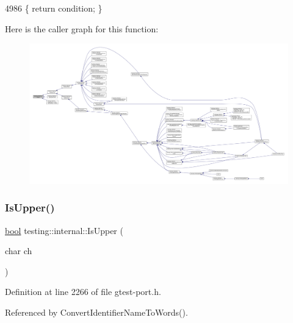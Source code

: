 \begin{DoxyCode}
4986 \{ \textcolor{keywordflow}{return} condition; \}
\end{DoxyCode}
Here is the caller graph for this function\+:
\nopagebreak
\begin{figure}[H]
\begin{center}
\leavevmode
\includegraphics[width=350pt]{namespacetesting_1_1internal_a527b9bcc13669b9a16400c8514266254_icgraph}
\end{center}
\end{figure}
\mbox{\label{namespacetesting_1_1internal_a84f3baa379fec6bf5947cb5165aa8cc9}} 
\subsubsection{\texorpdfstring{Is\+Upper()}{IsUpper()}}
{\footnotesize\ttfamily \hyperlink{classbool}{bool} testing\+::internal\+::\+Is\+Upper (\begin{DoxyParamCaption}\item[{char}]{ch }\end{DoxyParamCaption})\hspace{0.3cm}{\ttfamily [inline]}}



Definition at line 2266 of file gtest-\/port.\+h.



Referenced by Convert\+Identifier\+Name\+To\+Words().


